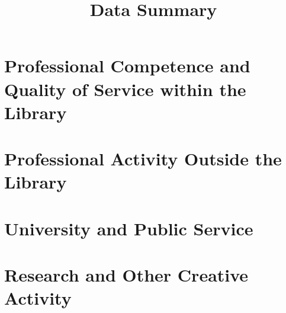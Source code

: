 \documentclass[12pt, oneside]{article}
\title{Data Summary}
\begin{document}
\date{}
\maketitle
\thispagestyle{fancy}



\section{Professional Competence and Quality of Service within the Library}




\section{Professional Activity Outside the Library}



\section{University and Public Service}



\section{Research and Other Creative Activity}


\end{document}

